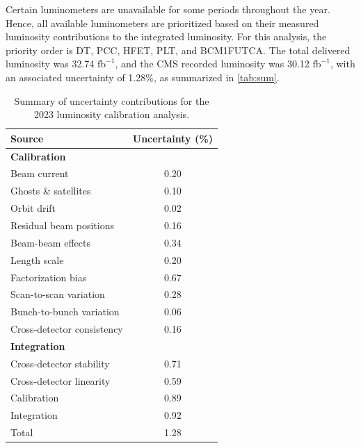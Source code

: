 Certain luminometers are unavailable for some periods throughout the year. Hence, all available luminometers are prioritized based on their measured luminosity contributions to the integrated luminosity. For this analysis, the priority order is DT, PCC, HFET, PLT, and BCM1FUTCA. The total delivered luminosity was 32.74 $\text{fb}^{-1}$, and the CMS recorded luminosity was 30.12 $\text{fb}^{-1}$, with an associated uncertainty of 1.28\%, as summarized in \autoref{tab:sum}.

\begin{table}[!h]
    \centering
    \caption{Summary of uncertainty contributions for the 2023 luminosity calibration analysis.}
    \label{tab:sum}
    \begin{tabular}{lc}
        \textbf{Source} & \textbf{Uncertainty} (\%) \\ \hline
        \textbf{Calibration} & \\
        Beam current & 0.20 \\
        Ghosts \& satellites & 0.10 \\
        Orbit drift & 0.02 \\
        Residual beam positions & 0.16 \\
        Beam-beam effects & 0.34 \\
        Length scale & 0.20 \\
        Factorization bias & 0.67 \\
        Scan-to-scan variation & 0.28 \\
        Bunch-to-bunch variation & 0.06 \\
        Cross-detector consistency & 0.16 \\ \hline
        \textbf{Integration} & \\
        Cross-detector stability & 0.71 \\
        Cross-detector linearity & 0.59 \\ %
        \hline \hline
        Calibration & 0.89 \\
        Integration & 0.92 \\ %
        \hline
        Total & 1.28 \\
    \end{tabular}
\end{table}

